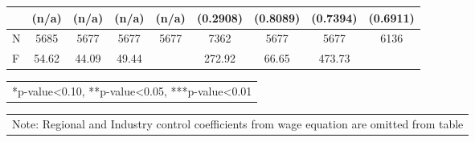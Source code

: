 \documentclass[12pt]{report}
\begin{document}
\begin{sidewaystable}
\begin{tabular}{lc|c|c|c|c|c|c|c}
& (n/a) & (n/a) & (n/a) & (n/a) & (0.2908) & (0.8089) & (0.7394) & (0.6911)\\
\hline
N & 5685 & 5677 & 5677 & 5677 & 7362 & 5677 & 5677 & 6136\\
F & 54.62 & 44.09 & 49.44 & & 272.92 & 66.65 & 473.73 & \\
\hline
\hline
\end{tabular}
\begin{tabular}{p{6.25in}}\footnotesize{
*p-value<0.10, **p-value<0.05, ***p-value<0.01}\\
\end{tabular}
\begin{tabular}{p{6.25in}}\footnotesize{
Note: Regional and Industry control coefficients from wage equation are omitted from table}\\
\end{tabular}
\end{sidewaystable}

\begin{comment}R-sq & 0.2386 & -0.2104 & -0.7662 & -0.7345 & 0.4042 & -1.3825 & -1.6180 & -1.6638\\
\end{comment}
\end{document}
